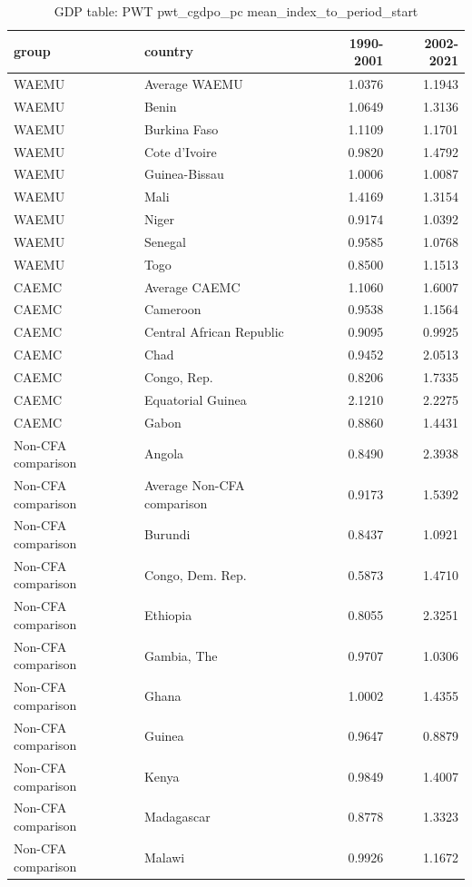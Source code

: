 \begin{table}

\caption{GDP table: PWT pwt_cgdpo_pc mean_index_to_period_start}
\centering
\begin{tabular}[t]{llrr}
\toprule
group & country & 1990-2001 & 2002-2021\\
\midrule
WAEMU & Average WAEMU & 1.0376 & 1.1943\\
WAEMU & Benin & 1.0649 & 1.3136\\
WAEMU & Burkina Faso & 1.1109 & 1.1701\\
WAEMU & Cote d'Ivoire & 0.9820 & 1.4792\\
WAEMU & Guinea-Bissau & 1.0006 & 1.0087\\
\addlinespace
WAEMU & Mali & 1.4169 & 1.3154\\
WAEMU & Niger & 0.9174 & 1.0392\\
WAEMU & Senegal & 0.9585 & 1.0768\\
WAEMU & Togo & 0.8500 & 1.1513\\
CAEMC & Average CAEMC & 1.1060 & 1.6007\\
\addlinespace
CAEMC & Cameroon & 0.9538 & 1.1564\\
CAEMC & Central African Republic & 0.9095 & 0.9925\\
CAEMC & Chad & 0.9452 & 2.0513\\
CAEMC & Congo, Rep. & 0.8206 & 1.7335\\
CAEMC & Equatorial Guinea & 2.1210 & 2.2275\\
\addlinespace
CAEMC & Gabon & 0.8860 & 1.4431\\
Non-CFA comparison & Angola & 0.8490 & 2.3938\\
Non-CFA comparison & Average Non-CFA comparison & 0.9173 & 1.5392\\
Non-CFA comparison & Burundi & 0.8437 & 1.0921\\
Non-CFA comparison & Congo, Dem. Rep. & 0.5873 & 1.4710\\
\addlinespace
Non-CFA comparison & Ethiopia & 0.8055 & 2.3251\\
Non-CFA comparison & Gambia, The & 0.9707 & 1.0306\\
Non-CFA comparison & Ghana & 1.0002 & 1.4355\\
Non-CFA comparison & Guinea & 0.9647 & 0.8879\\
Non-CFA comparison & Kenya & 0.9849 & 1.4007\\
\addlinespace
Non-CFA comparison & Madagascar & 0.8778 & 1.3323\\
Non-CFA comparison & Malawi & 0.9926 & 1.1672\\

\end{tabular}
\end{table}
